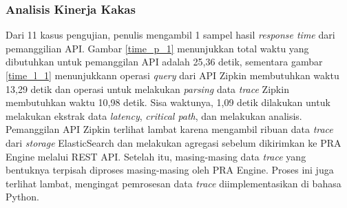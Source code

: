 %
%
%
%
%
%
%

\subsubsection{Analisis Kinerja Kakas}
Dari 11 kasus pengujian, penulis mengambil 1 sampel hasil \textit{response time} dari pemanggilian API. Gambar \ref{time_p_1} menunjukkan total waktu yang dibutuhkan untuk pemanggilan API adalah 25,36 detik, sementara gambar \ref{time_l_1} menunjukkann operasi \textit{query} dari API Zipkin membutuhkan waktu 13,29 detik dan operasi untuk melakukan \textit{parsing} data \textit{trace} Zipkin membutuhkan waktu 10,98 detik. Sisa waktunya, 1,09 detik dilakukan untuk melakukan ekstrak data \textit{latency}, \textit{critical path}, dan  melakukan analisis. Pemanggilan API Zipkin terlihat lambat karena mengambil ribuan data \textit{trace} dari \textit{storage} ElasticSearch dan melakukan agregasi sebelum dikirimkan ke PRA Engine melalui REST API. Setelah itu, masing-masing data \textit{trace} yang bentuknya terpisah diproses masing-masing oleh PRA Engine. Proses ini juga terlihat lambat, mengingat pemrosesan data \textit{trace} diimplementasikan di bahasa Python. 

